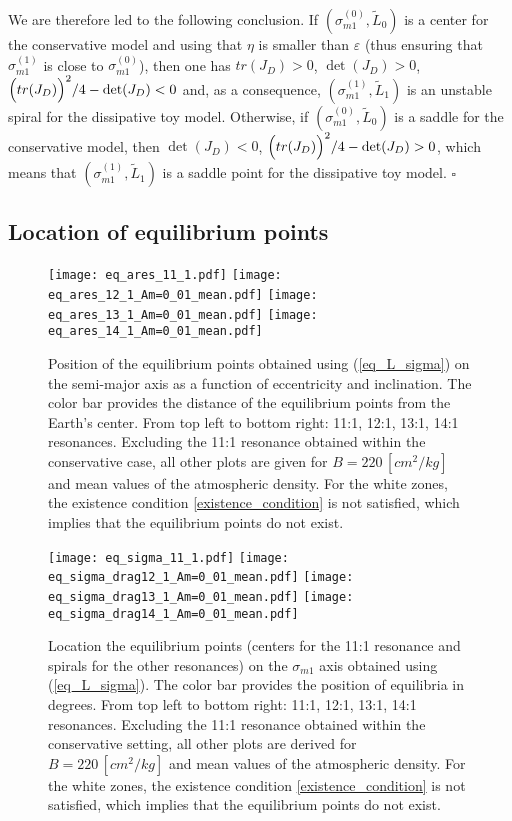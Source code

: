 \documentclass[12pt,reqno]{amsart}
\numberwithin{equation}{section}
\newcommand\equ[1]{{\rm (\ref{#1})}}
\begin{document}
We are therefore led to the following conclusion. If $(\sigma_{m1}^{(0)}, \widetilde{L}_0)$
is a center for the conservative model and using that $\eta$ is smaller
than $\varepsilon$ (thus ensuring that $\sigma_{m1}^{(1)}$ is close to $\sigma_{m1}^{(0)}$), then
one has $tr (J_D)>0$,  $\det(J_D) > 0$,
$\Bigl(tr (J_D)\Bigr)^2/4-\det(J_D) <0$ and, as a consequence,
$(\sigma_{m1}^{(1)}, \widetilde{L}_1)$ is an unstable spiral for the dissipative toy model.
Otherwise, if $(\sigma_{m1}^{(0)}, \widetilde{L}_0)$ is a saddle for the conservative model,
then $\det(J_D) < 0$, $\Bigl(tr (J_D)\Bigr)^2/4-\det(J_D) >0$,
which means that $(\sigma_{m1}^{(1)}, \widetilde{L}_1)$ is a saddle point for the dissipative toy model. $\square$


\subsection{Location of equilibrium points} \label{sec:location}

\begin{figure}[h]
\centering {} 
\texttt{[image: eq\_ares\_11\_1.pdf]}
\texttt{[image: eq\_ares\_12\_1\_Am=0\_01\_mean.pdf]}
\texttt{[image: eq\_ares\_13\_1\_Am=0\_01\_mean.pdf]}
\texttt{[image: eq\_ares\_14\_1\_Am=0\_01\_mean.pdf]}
\caption{Position of the equilibrium points obtained using \equ{eq_L_sigma}
on the semi-major axis as a function of eccentricity and inclination.
The color bar provides the distance of the equilibrium points from the Earth's center. From top left to bottom right: 11:1, 12:1, 13:1, 14:1
resonances.
Excluding the 11:1 resonance obtained within the conservative case, all other plots are given
for  $B=220\, [cm^2/kg]$ and mean values of the atmospheric density. For the white zones,
the existence condition \eqref{existence_condition} is not satisfied,
which implies that the equilibrium points do not exist.} \label{fig:eq_a_axis}
\end{figure}


\begin{figure}[h]
\centering {} 
\texttt{[image: eq\_sigma\_11\_1.pdf]}
\texttt{[image: eq\_sigma\_drag12\_1\_Am=0\_01\_mean.pdf]}
\texttt{[image: eq\_sigma\_drag13\_1\_Am=0\_01\_mean.pdf]}
\texttt{[image: eq\_sigma\_drag14\_1\_Am=0\_01\_mean.pdf]}
\caption{Location the
equilibrium points (centers for the 11:1 resonance and spirals for the other resonances) on the $\sigma_{m1}$ axis
obtained using \equ{eq_L_sigma}. The color bar provides the position of equilibria in degrees. From top left to bottom right: 11:1, 12:1, 13:1, 14:1
resonances. Excluding the 11:1 resonance obtained within the conservative setting, all other plots are derived for  $B=220\, [cm^2/kg]$ and mean values of the atmospheric density. For the white zones, the existence condition \eqref{existence_condition}
is not satisfied, which implies that the equilibrium points do not exist.} \label{fig:eq_sigma_axis}
\end{figure}
\end{document}
